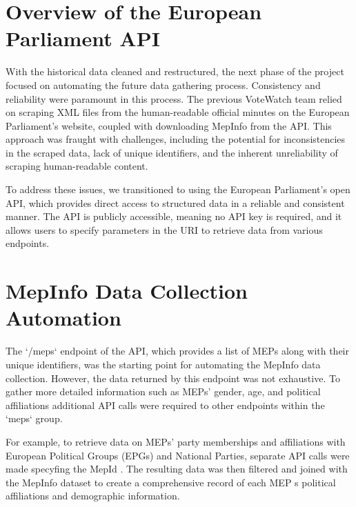 \documentclass{report}
\begin{document}
        \section{Overview of the European Parliament API}

            With the historical data cleaned and restructured, the next phase of the project focused on automating the
            future
            data gathering process. Consistency and reliability were paramount in this process. The previous VoteWatch
            team
            relied on scraping XML files from the human-readable official minutes on the European Parliament's website,
            coupled
            with downloading MepInfo from the API. This approach was fraught with challenges, including the potential
            for
            inconsistencies in the scraped data, lack of unique identifiers, and the inherent unreliability of scraping
            human-readable content.

            To address these issues, we transitioned to using the European Parliament's open API, which provides direct
            access
            to structured data in a reliable and consistent manner. The API is publicly accessible, meaning no API key
            is
            required, and it allows users to specify parameters in the URI to retrieve data from various endpoints.


        \section{MepInfo Data Collection Automation}
            The `/meps` endpoint of the API, which provides a list of MEPs along with their unique identifiers, was the
            starting
            point for automating the MepInfo data collection. However, the data returned by this endpoint was not
            exhaustive. To
            gather more detailed information such as MEPs' gender, age, and political affiliations additional API calls
            were
            required to other endpoints within the `meps` group.

            For example, to retrieve data on MEPs' party memberships and affiliations with European Political Groups
            (EPGs) and
            National Parties, separate API calls were made specyfing the MepId . The resulting data was then filtered
            and joined
            with the MepInfo dataset to create a comprehensive record of each MEP s political affiliations and
            demographic
            information.
\end{document}
